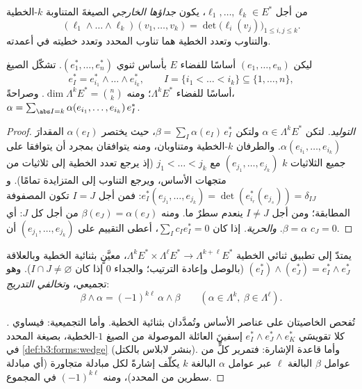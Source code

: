 \begin{definition}\label{def:b3:forms:wedge}
من أجل $\ell_1, \dots, \ell_k \in E^*$، يكون \emph{جداؤها الخارجي}
الصيغةَ المتناوبة $k$-الخطية
\[
(\ell_1 \wedge \dots \wedge \ell_k)(v_1, \dots, v_k)
= \det\bigl(\ell_i(v_j)\bigr)_{1 \leq i, j \leq k} .
\]
والتناوب وتعدد الخطية هما تناوب المحدد وتعدد خطيته في أعمدته.
\end{definition}

\begin{proposition}\label{prop:b3:forms:basis}
ليكن $(e_1, \dots, e_n)$ أساسًا للفضاء $E$ بأساس ثنوي $(e_1^*, \dots, e_n^*)$. تشكّل الصيغ
\[
e_I^* = e_{i_1}^* \wedge \dots \wedge e_{i_k}^*,
\qquad I = \{i_1 < \dots < i_k\} \subseteq \{1, \dots, n\},
\]
أساسًا للفضاء $\Lambda^kE^*$؛ ومنه $\dim\Lambda^kE^* =
\binom nk$. وصراحةً، $\alpha =
\sum_{\abs I = k}\alpha(e_{i_1}, \dots, e_{i_k})\,e_I^*$.
\end{proposition}

\begin{proof}
\emph{التوليد.} لتكن $\alpha \in \Lambda^kE^*$ ولتكن $\beta =
\sum_I\alpha(e_I)\,e_I^*$، حيث يختصر
$\alpha(e_I)$ المقدارَ $\alpha(e_{i_1}, \dots, e_{i_k})$. والطرفان $k$-الخطية ومتناوبان،
ومنه يتوافقان بمجرد أن يتوافقا على جميع الثلاثيات $k$ $(e_{j_1}, \dots, e_{j_k})$
مع $j_1 < \dots <
j_k$ (إذ يرجع تعدد الخطية إلى ثلاثيات من متجهات الأساس،
ويرجع التناوب إلى المتزايدة تمامًا). و $e_I^*(e_{j_1},
\dots, e_{j_k}) = \det(e_{i_r}^*(e_{j_s})) = \delta_{IJ}$: فمن أجل $I = J$
تكون المصفوفة المطابقة؛ ومن أجل $I \neq J$ ينعدم سطرٌ ما. ومنه
$\beta(e_J) = \alpha(e_J)$ من أجل كل $J$: أي $\beta = \alpha$. \emph{والحرية.} إذا
كان $\sum_I c_Ie_I^* = 0$، أعطى التقييم على $(e_{j_1}, \dots, e_{j_k})$ أن $c_J = 0$.
\end{proof}

\begin{definition}\label{def:b3:forms:wedgegeneral}
يمتدّ  إلى تطبيق ثنائي الخطية $\Lambda^kE^* \times \Lambda^\ell E^* \to
\Lambda^{k+\ell}E^*$، معيَّنٍ
بثنائية الخطية وبالعلاقة $(e_I^*) \wedge (e_J^*) = e_I^* \wedge e_J^*$ (بالوصل وإعادة الترتيب؛
والجداء $0$ إذا كان $I \cap J \neq
\varnothing$). وهو تجميعي، و\emph{تخالفي
التدريج}:
\[
\beta \wedge \alpha = (-1)^{k\ell}\,\alpha \wedge \beta
\qquad (\alpha \in \Lambda^k, \ \beta \in \Lambda^\ell).
\]
\end{definition}

\begin{proof}[\omnameProof]
تُفحص الخاصيتان على عناصر الأساس وتُمدَّدان بثنائية الخطية.
وأما التجميعية: فيساوي كلا تقويسَي $e_I^* \wedge e_J^* \wedge e_K^*$ إسفينَ العائلة
الموصولة من الصيغ $1$-الخطية، بصيغة المحدد في \cref{def:b3:forms:wedge}
(بنشر لابلاس بالكتل). وأما قاعدة الإشارة: فتمرير كلٍّ من عوامل
$\beta$ البالغة $\ell$ عبر عوامل $\alpha$ البالغة $k$ يكلّف
إشارةً لكل مبادلة متجاورة (أي مبادلة سطرين من المحدد)، ومنه
$(-1)^{k\ell}$ في المجموع.
\end{proof}

